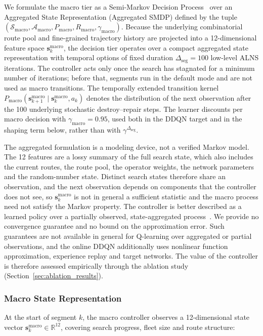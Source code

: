 \documentclass{ieeeaccess}
\begin{document}
We formulate the macro tier as a Semi-Markov Decision Process~\cite{sutton1999between} over an Aggregated State Representation (Aggregated SMDP) defined by the tuple $(\mathcal{S}_{\text{macro}}, \mathcal{A}_{\text{macro}}, P_{\text{macro}}, R_{\text{macro}}, \gamma_{\text{macro}})$. Because the underlying combinatorial route pool and fine-grained trajectory history are projected into a 12-dimensional feature space $\mathbf{s}_k^{\text{macro}}$, the decision tier operates over a compact aggregated state representation with temporal options of fixed duration $\Delta_{\text{seg}} = 100$ low-level ALNS iterations. The controller acts only once the search has stagnated for a minimum number of iterations; before that, segments run in the default mode and are not used as macro transitions. The temporally extended transition kernel $P_{\text{macro}}(\mathbf{s}_{k+1}^{\text{macro}} \mid \mathbf{s}_k^{\text{macro}}, a_k)$ denotes the distribution of the next observation after the 100 underlying stochastic destroy--repair steps. The learner discounts per macro decision with $\gamma_{\text{macro}} = 0.95$, used both in the DDQN target and in the shaping term below, rather than with $\gamma^{\Delta_{\text{seg}}}$.

The aggregated formulation is a modeling device, not a verified Markov model. The 12 features are a lossy summary of the full search state, which also includes the current routes, the route pool, the operator weights, the network parameters and the random-number state. Distinct search states therefore share an observation, and the next observation depends on components that the controller does not see, so $\mathbf{s}_k^{\text{macro}}$ is not in general a sufficient statistic and the macro process need not satisfy the Markov property. The controller is better described as a learned policy over a partially observed, state-aggregated process~\cite{li2006unified}. We provide no convergence guarantee and no bound on the approximation error. Such guarantees are not available in general for Q-learning over aggregated or partial observations, and the online DDQN additionally uses nonlinear function approximation, experience replay and target networks. The value of the controller is therefore assessed empirically through the ablation study (Section~\ref{sec:ablation_results}).

\subsubsection{Macro State Representation}
At the start of segment $k$, the macro controller observes a 12-dimensional state vector $\mathbf{s}_k^{\text{macro}} \in \mathbb{R}^{12}$, covering search progress, fleet size and route structure:
\end{document}
